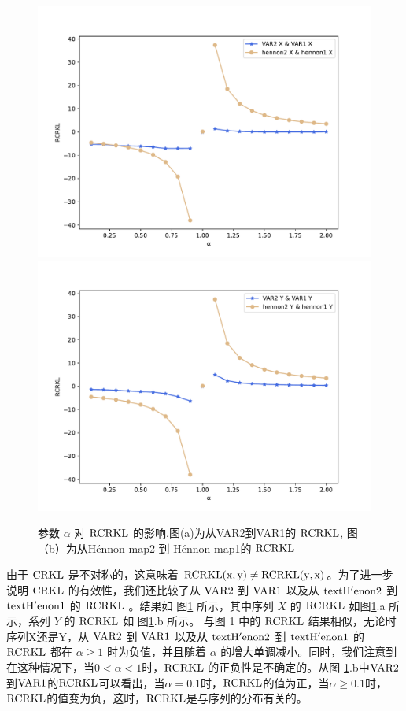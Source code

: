 \begin{figure}[htbp]
\begin{center}
\includegraphics[scale=0.35]{./ch2/fig2_3.pdf}\label{a}
\includegraphics[scale=0.35]{./ch2/fig2_4.pdf}\label{b}
\caption{参数 $\alpha$ 对 $\rm{RCRKL}$ 的影响,图(a)为从VAR2到VAR1的 $\rm{RCRKL}$, 图（b）为从H\'{e}nnon map2 到 H\'{e}nnon map1的 $\rm{RCRKL}$} \label{fig2}
\end{center}
\end{figure}\label{x_y_var1}

由于 $\rm{CRKL}$ 是不对称的，这意味着 $\rm{RCRKL}(x,y) \neq \rm{RCRKL}(y,x)$。为了进一步说明 $\rm{CRKL}$ 的有效性，我们还比较了从 $\rm{VAR2}$ 到 $\rm{VAR1}$ 以及从 $\rm{text{H'{e}non}2}$ 到 $\rm{text{H'{e}non}1}$ 的 $\rm{RCRKL}$ 。结果如 图\ref{fig2} 所示，其中序列 $X$ 的 $\rm{RCRKL}$ 如图\ref{fig2}.a 所示，系列 $Y$ 的 $\rm{RCRKL}$ 如 图\ref{fig2}.b 所示。 与图 1 中的 $\rm{RCRKL}$ 结果相似，无论时序列X还是Y，从 $\rm{VAR2}$ 到 $\rm{VAR1}$ 以及从 $\rm{text{H'{e}non}2}$ 到 $\rm{text{H'{e}non}1}$ 的 $\rm{RCRKL}$ 都在 $\alpha\ge 1$ 时为负值，并且随着 $\alpha$ 的增大单调减小。同时，我们注意到在这种情况下，当$0<\alpha <1$时，$\rm{RCRKL}$ 的正负性是不确定的。从图 \ref{fig2}.b中$\rm{VAR2}$到$\rm{VAR1}$的$\rm{RCRKL}$可以看出，当$\alpha = 0.1$时，$\rm{RCRKL}$的值为正，当$\alpha \ge 0.1$时，$\rm{RCRKL}$的值变为负，这时，$\rm{RCRKL}$是与序列的分布有关的。

